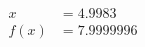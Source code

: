 \documentclass[preview]{standalone}
\begin{document}
\begin{align*}
x &= 4.9983\\f(x) &= 7.9999996
\end{align*}
\end{document}
